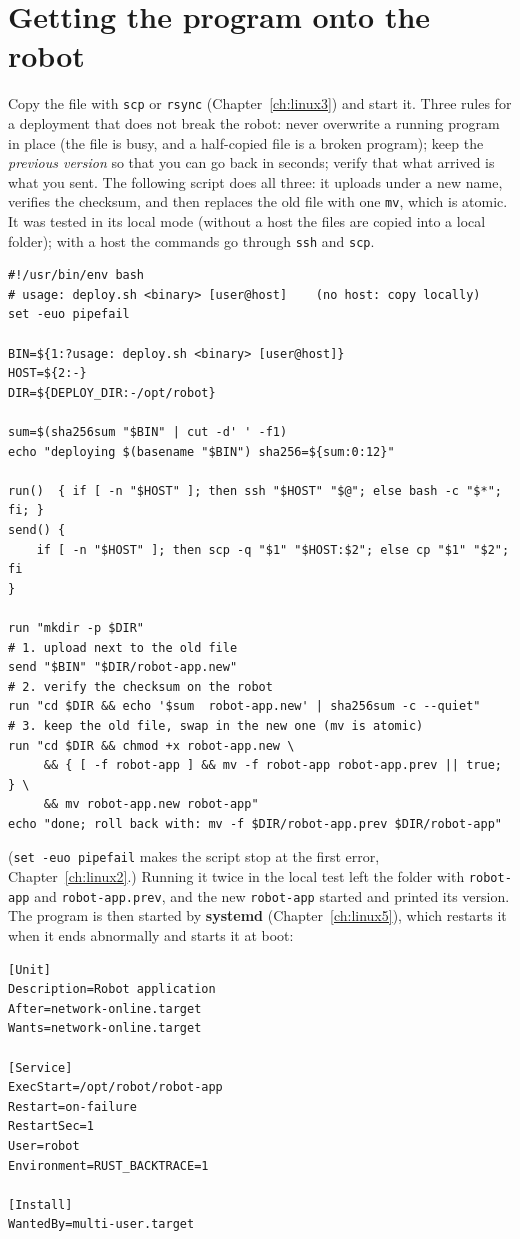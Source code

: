 \section*{Getting the program onto the robot}
Copy the file with \verb!scp! or \verb!rsync! (Chapter~\ref{ch:linux3}) and start it. Three rules for a deployment that does not break the robot: never overwrite a running program in place (the file is busy, and a half-copied file is a broken program); keep the \emph{previous version} so that you can go back in seconds; verify that what arrived is what you sent. The following script does all three: it uploads under a new name, verifies the checksum, and then replaces the old file with one \verb!mv!, which is atomic. It was tested in its local mode (without a host the files are copied into a local folder); with a host the commands go through \verb!ssh! and \verb!scp!.
\begin{verbatim}
#!/usr/bin/env bash
# usage: deploy.sh <binary> [user@host]    (no host: copy locally)
set -euo pipefail

BIN=${1:?usage: deploy.sh <binary> [user@host]}
HOST=${2:-}
DIR=${DEPLOY_DIR:-/opt/robot}

sum=$(sha256sum "$BIN" | cut -d' ' -f1)
echo "deploying $(basename "$BIN") sha256=${sum:0:12}"

run()  { if [ -n "$HOST" ]; then ssh "$HOST" "$@"; else bash -c "$*"; fi; }
send() {
    if [ -n "$HOST" ]; then scp -q "$1" "$HOST:$2"; else cp "$1" "$2"; fi
}

run "mkdir -p $DIR"
# 1. upload next to the old file
send "$BIN" "$DIR/robot-app.new"
# 2. verify the checksum on the robot
run "cd $DIR && echo '$sum  robot-app.new' | sha256sum -c --quiet"
# 3. keep the old file, swap in the new one (mv is atomic)
run "cd $DIR && chmod +x robot-app.new \
     && { [ -f robot-app ] && mv -f robot-app robot-app.prev || true; } \
     && mv robot-app.new robot-app"
echo "done; roll back with: mv -f $DIR/robot-app.prev $DIR/robot-app"
\end{verbatim}
(\verb!set -euo pipefail! makes the script stop at the first error, Chapter~\ref{ch:linux2}.) Running it twice in the local test left the folder with \verb!robot-app! and \verb!robot-app.prev!, and the new \verb!robot-app! started and printed its version. The program is then started by \textbf{systemd} (Chapter~\ref{ch:linux5}), which restarts it when it ends abnormally and starts it at boot:
\begin{verbatim}
[Unit]
Description=Robot application
After=network-online.target
Wants=network-online.target

[Service]
ExecStart=/opt/robot/robot-app
Restart=on-failure
RestartSec=1
User=robot
Environment=RUST_BACKTRACE=1

[Install]
WantedBy=multi-user.target
\end{verbatim}
